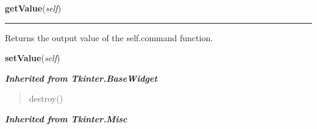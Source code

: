     \vspace{0.5ex}

\hspace{.8\funcindent}\begin{boxedminipage}{\funcwidth}

    \raggedright \textbf{getValue}(\textit{self})

    \vspace{-1.5ex}

    \rule{\textwidth}{0.5\fboxrule}
\setlength{\parskip}{2ex}
    Returns the output value of the {\textbar}self.command{\textbar} 
    function.

\setlength{\parskip}{1ex}
    \end{boxedminipage}

    \label{nMOLDYN:GUI:Widgets:ComboButton:setValue}

    \vspace{0.5ex}

\hspace{.8\funcindent}\begin{boxedminipage}{\funcwidth}

    \raggedright \textbf{setValue}(\textit{self})

\setlength{\parskip}{2ex}
\setlength{\parskip}{1ex}
    \end{boxedminipage}


\large{\textbf{\textit{Inherited from Tkinter.BaseWidget}}}

\begin{quote}
destroy()
\end{quote}

\large{\textbf{\textit{Inherited from Tkinter.Misc}}}

